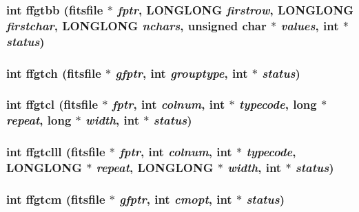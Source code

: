 \subsubsection{\setlength{\rightskip}{0pt plus 5cm}int ffgtbb (\bf{fitsfile} $\ast$ {\em fptr}, \bf{LONGLONG} {\em firstrow}, \bf{LONGLONG} {\em firstchar}, \bf{LONGLONG} {\em nchars}, unsigned char $\ast$ {\em values}, int $\ast$ {\em status})}\label{fitsio__64_8h_a5bbc15ac0a696cabe2c3b192161bdcc}


\subsubsection{\setlength{\rightskip}{0pt plus 5cm}int ffgtch (\bf{fitsfile} $\ast$ {\em gfptr}, int {\em grouptype}, int $\ast$ {\em status})}\label{fitsio__64_8h_d96e000e88b7c66d74535f173ebe323a}


\subsubsection{\setlength{\rightskip}{0pt plus 5cm}int ffgtcl (\bf{fitsfile} $\ast$ {\em fptr}, int {\em colnum}, int $\ast$ {\em typecode}, long $\ast$ {\em repeat}, long $\ast$ {\em width}, int $\ast$ {\em status})}\label{fitsio__64_8h_94467c6f6ab0cc865044556b263753a9}


\subsubsection{\setlength{\rightskip}{0pt plus 5cm}int ffgtclll (\bf{fitsfile} $\ast$ {\em fptr}, int {\em colnum}, int $\ast$ {\em typecode}, \bf{LONGLONG} $\ast$ {\em repeat}, \bf{LONGLONG} $\ast$ {\em width}, int $\ast$ {\em status})}\label{fitsio__64_8h_6c74e11e1c017c8f4734409364b66557}


\subsubsection{\setlength{\rightskip}{0pt plus 5cm}int ffgtcm (\bf{fitsfile} $\ast$ {\em gfptr}, int {\em cmopt}, int $\ast$ {\em status})}\label{fitsio__64_8h_ba91f4a1df946128be52a14ee69a1fd7}


